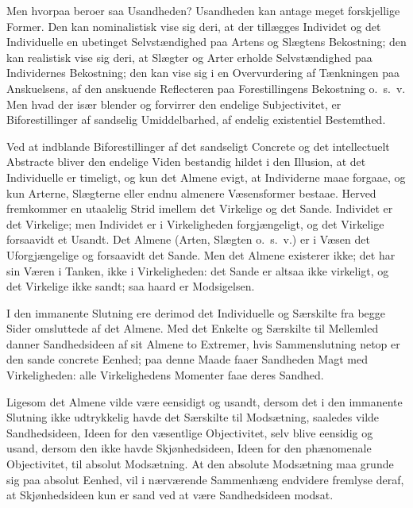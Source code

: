 \documentclass[12pt]{book}
\newcommand{\opage}[1]{\marginnote{\footnotesize\textit{[#1]}}}
\begin{document}
Men hvorpaa beroer saa Usandheden? Usandheden kan antage meget forskjellige Former. Den kan nominalistisk vise sig deri, at der tillægges Individet og det Individuelle en ubetinget Selvstændighed paa Artens og Slægtens Bekostning; den kan realistisk vise sig deri, at Slægter og Arter erholde Selvstændighed paa Individernes Bekostning; den kan vise sig i en Overvurdering af Tænkningen paa Anskuelsens, af den anskuende Reflecteren paa Forestillingens Bekostning o.~s.~v. Men hvad der især blender og forvirrer den endelige Subjectivitet, er Biforestillinger af sandselig Umiddelbarhed, af endelig existentiel Bestemthed.

Ved at indblande Biforestillinger af det sandseligt Concrete og det intellectuelt Abstracte bliver den endelige Viden bestandig hildet i den Illusion, at det Individuelle er timeligt, og kun det Almene evigt, at Individerne maae forgaae, og kun Arterne, Slægterne eller endnu almenere Væsensformer bestaae. Herved fremkommer en utaalelig Strid imellem det Virkelige og det Sande. Individet er det Virkelige; men Individet er i Virkeligheden forgjængeligt, og det Virkelige forsaavidt et Usandt. Det Almene (Arten, Slægten o.~s.~v.) er i Væsen det Uforgjængelige og forsaavidt det Sande.
\opage{376}Men det Almene existerer ikke; det har sin Væren i Tanken, ikke i Virkeligheden: det Sande er altsaa ikke virkeligt, og det Virkelige ikke sandt; saa haard er Modsigelsen.

I den immanente Slutning ere derimod det Individuelle og Særskilte fra begge Sider omsluttede af det Almene. Med det Enkelte og Særskilte til Mellemled danner Sandhedsideen af sit Almene to Extremer, hvis Sammenslutning netop er den sande concrete Eenhed; paa denne Maade faaer Sandheden Magt med Virkeligheden: alle Virkelighedens Momenter faae deres Sandhed.

Ligesom det Almene vilde være eensidigt og usandt, dersom det i den immanente Slutning ikke udtrykkelig havde det Særskilte til Modsætning, saaledes vilde Sandhedsideen, Ideen for den væsentlige Objectivitet, selv blive eensidig og usand, dersom den ikke havde Skjønhedsideen, Ideen for den phænomenale Objectivitet, til absolut Modsætning. At den absolute Modsætning maa grunde sig paa absolut Eenhed, vil i nærværende Sammenhæng endvidere fremlyse deraf, at Skjønhedsideen kun er sand ved at være Sandhedsideen modsat.
\end{document}

